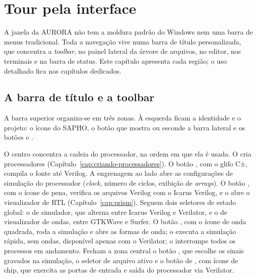 \chapter{Tour pela interface}
\label{cap:tour-interface}

A janela da AURORA não tem a moldura padrão do Windows nem uma barra de menus tradicional. Toda a navegação vive numa barra de título personalizada, que concentra a \textit{toolbar}, no painel lateral da árvore de arquivos, no editor, nos terminais e na barra de status. Este capítulo apresenta cada região; o uso detalhado fica nos capítulos dedicados.


\section{A barra de título e a toolbar}
\label{sec:toolbar}

A barra superior organiza-se em três zonas. À esquerda ficam a identidade e o projeto: o ícone do SAPHO, o botão que mostra ou esconde a barra lateral e os botões  e .

O centro concentra a cadeia do processador, na ordem em que ela é usada. O  cria processadores (Capítulo~\ref{cap:criando-processadores}). O botão , com o glifo C±, compila o fonte até Verilog. A engrenagem ao lado abre as configurações de simulação do processador (\textit{clock}, número de ciclos, exibição de \textit{arrays}). O botão , com o ícone de pena, verifica os arquivos Verilog com o Icarus Verilog, e o  abre o visualizador de RTL (Capítulo~\ref{cap:prism}). Seguem dois seletores de estado global: o de simulador, que alterna entre Icarus Verilog e Verilator, e o de visualizador de ondas, entre GTKWave e Surfer. O botão , com o ícone de onda quadrada, roda a simulação e abre as formas de onda; o  executa a simulação rápida, sem ondas, disponível apenas com o Verilator; o  interrompe todos os processos em andamento. Fecham a zona central o botão , que escolhe os sinais gravados na simulação, o seletor de arquivo  ativo e o botão de , com ícone de chip, que exercita as portas de entrada e saída do processador via Verilator.


